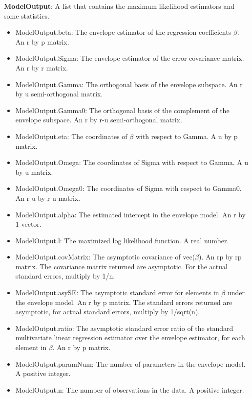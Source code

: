 \documentclass[a4paper,11pt,openany]{memoir}
\begin{document}
\begin{par}
\textbf{ModelOutput}: A list that contains the maximum likelihood estimators and some statistics.
\end{par} \vspace{1em}
\begin{itemize}
\setlength{\itemsep}{-1ex}
   \item ModelOutput.beta: The envelope estimator of the regression coefficients $\beta$. An r by p matrix.
   \item ModelOutput.Sigma: The envelope estimator of the error covariance matrix.  An r by r matrix.
   \item ModelOutput.Gamma: The orthogonal basis of the envelope subspace. An r by u semi-orthogonal matrix.
   \item ModelOutput.Gamma0: The orthogonal basis of the complement of the envelope subspace.  An r by r-u semi-orthogonal matrix.
   \item ModelOutput.eta: The coordinates of $\beta$ with respect to Gamma. A u by p matrix.
   \item ModelOutput.Omega: The coordinates of Sigma with respect to Gamma. A u by u matrix.
   \item ModelOutput.Omega0: The coordinates of Sigma with respect to Gamma0. An r-u by r-u matrix.
   \item ModelOutput.alpha: The estimated intercept in the envelope model.  An r by 1 vector.
   \item ModelOutput.l: The maximized log likelihood function.  A real number.
   \item ModelOutput.covMatrix: The asymptotic covariance of vec($\beta$).  An rp by rp matrix.  The covariance matrix returned are asymptotic.  For the actual standard errors, multiply by 1/n.
   \item ModelOutput.asySE: The asymptotic standard error for elements in $\beta$ under the envelope model.  An r by p matrix.  The standard errors returned are asymptotic, for actual standard errors, multiply by 1/sqrt(n).
   \item ModelOutput.ratio: The asymptotic standard error ratio of the standard multivariate linear regression estimator over the envelope estimator, for each element in $\beta$.  An r by p matrix.
   \item ModelOutput.paramNum: The number of parameters in the envelope model.  A positive integer.
   \item ModelOutput.n: The number of observations in the data.  A positive integer.
\end{itemize}
\end{document}
